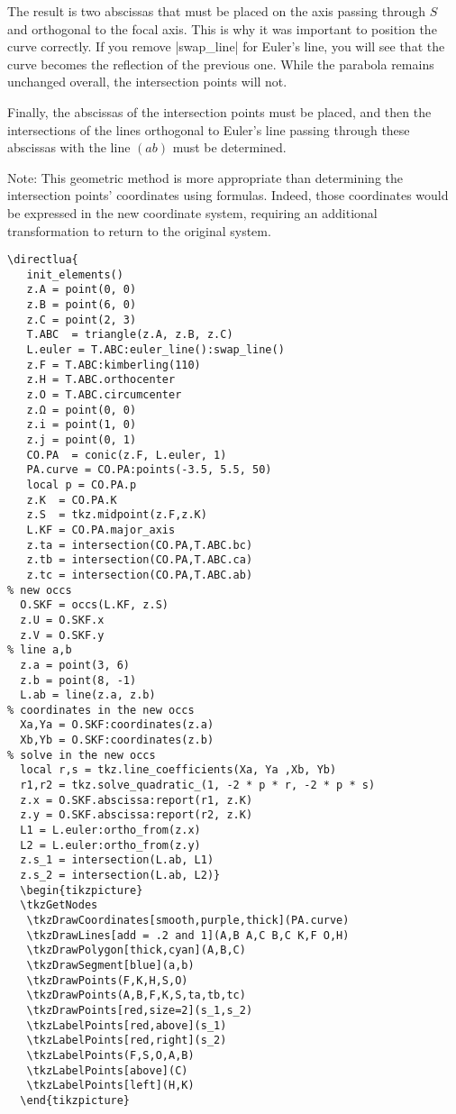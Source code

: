 The result is two abscissas that must be placed on the axis passing through $S$ and orthogonal to the focal axis. This is why it was important to position the curve correctly. If you remove |swap_line| for Euler's line, you will see that the curve becomes the reflection of the previous one. While the parabola remains unchanged overall, the intersection points will not.

Finally, the abscissas of the intersection points must be placed, and then the intersections of the lines orthogonal to Euler's line passing through these abscissas with the line $(ab)$ must be determined.

Note: This geometric method is more appropriate than determining the intersection points' coordinates using formulas. Indeed, those coordinates would be expressed in the new coordinate system, requiring an additional transformation to return to the original system.

\begin{verbatim}
\directlua{
   init_elements()
   z.A = point(0, 0)
   z.B = point(6, 0)
   z.C = point(2, 3)
   T.ABC  = triangle(z.A, z.B, z.C)
   L.euler = T.ABC:euler_line():swap_line()
   z.F = T.ABC:kimberling(110)
   z.H = T.ABC.orthocenter
   z.O = T.ABC.circumcenter
   z.Ω = point(0, 0)
   z.i = point(1, 0)
   z.j = point(0, 1)
   CO.PA  = conic(z.F, L.euler, 1)
   PA.curve = CO.PA:points(-3.5, 5.5, 50)
   local p = CO.PA.p
   z.K  = CO.PA.K
   z.S  = tkz.midpoint(z.F,z.K)
   L.KF = CO.PA.major_axis
   z.ta = intersection(CO.PA,T.ABC.bc)
   z.tb = intersection(CO.PA,T.ABC.ca)
   z.tc = intersection(CO.PA,T.ABC.ab)
% new occs
  O.SKF = occs(L.KF, z.S)
  z.U = O.SKF.x
  z.V = O.SKF.y
% line a,b
  z.a = point(3, 6)
  z.b = point(8, -1)
  L.ab = line(z.a, z.b)
% coordinates in the new occs
  Xa,Ya = O.SKF:coordinates(z.a)
  Xb,Yb = O.SKF:coordinates(z.b)
% solve in the new occs
  local r,s = tkz.line_coefficients(Xa, Ya ,Xb, Yb)
  r1,r2 = tkz.solve_quadratic_(1, -2 * p * r, -2 * p * s)
  z.x = O.SKF.abscissa:report(r1, z.K)
  z.y = O.SKF.abscissa:report(r2, z.K)
  L1 = L.euler:ortho_from(z.x)
  L2 = L.euler:ortho_from(z.y)
  z.s_1 = intersection(L.ab, L1)
  z.s_2 = intersection(L.ab, L2)}
  \begin{tikzpicture}
  \tkzGetNodes
   \tkzDrawCoordinates[smooth,purple,thick](PA.curve)
   \tkzDrawLines[add = .2 and 1](A,B A,C B,C K,F O,H)
   \tkzDrawPolygon[thick,cyan](A,B,C)
   \tkzDrawSegment[blue](a,b)
   \tkzDrawPoints(F,K,H,S,O)
   \tkzDrawPoints(A,B,F,K,S,ta,tb,tc)
   \tkzDrawPoints[red,size=2](s_1,s_2)
   \tkzLabelPoints[red,above](s_1)
   \tkzLabelPoints[red,right](s_2)
   \tkzLabelPoints(F,S,O,A,B)
   \tkzLabelPoints[above](C)
   \tkzLabelPoints[left](H,K)
  \end{tikzpicture}
\end{verbatim}

